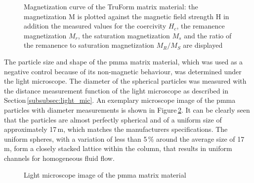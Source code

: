 \begin{figure}[h]
\centering

\caption[Magnetization curve of the TruForm matrix material]{Magnetization curve of the TruForm matrix material: the magnetization M is plotted against the magnetic field strength H in addition the measured values for the coercivity $H_{c}$, the remanence magnetization $M_{r}$, the saturation magnetization $M_{s}$ and the ratio of the remanence to saturation magnetization $M_{R}/M_{S}$ are displayed
\label{fig:Prax_hyst}
}
\end{figure}

The particle size and shape of the \gls{pmma} matrix material, which was used as a negative control because of its non-magnetic behaviour, was determined under the light microscope. The diameter of the spherical particles was measured with the distance measurement function of the light microscope as described in Section\,\ref{subsubsec:light_mic}. An exemplary microscope image of the \gls{pmma} particles with diameter measurements is shown in Figure\,\ref{fig:PMMA}. It can be clearly seen that the particles are almost perfectly spherical and of a uniform size of approximately 17\,\textmu m, which matches the manufacturers specifications. The uniform spheres, with a variation of less than 5\,\% around the average size of 17\,\textmu m, form a closely stacked lattice within the column, that results in uniform channels for homogeneous fluid flow.

\begin{figure}[h]
\centering

\caption[Light microscope image of \gls{pmma}]{Light microscope image of the \gls{pmma} matrix material
\label{fig:PMMA}
}
\end{figure}


